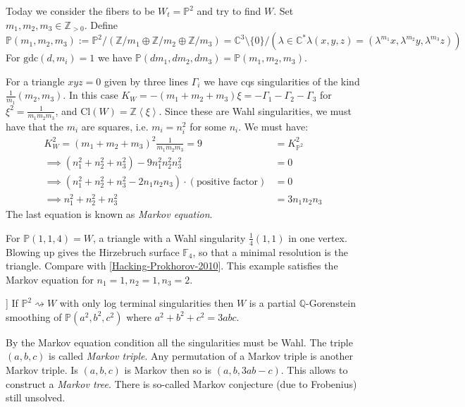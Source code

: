 \medskip\noindent

Today we consider the fibers to be $W_t=\mathbb{P}^2$ and
try to find $W$. Set $m_1,m_2,m_3\in\mathbb{Z}_{>0}$. Define
$$
\mathbb{P}(m_1,m_2,m_3):=
\mathbb{P}^2/(\mathbb{Z}/m_1\oplus\mathbb{Z}/m_2\oplus\mathbb{Z}/m_3)
=\mathbb{C}^3\setminus\{0\}/(\lambda\in\mathbb{C}^*\lambda(x,y,z)
=(\lambda^{m_1}x,\lambda^{m_2}y,\lambda^{m_3}z))
$$
For $\text{gdc}(d,m_i)=1$ we have
$\mathbb{P}(dm_1,dm_2,dm_3)=\mathbb{P}(m_1,m_2,m_3)$.

For a triangle $xyz=0$ given by three lines $\Gamma_i$ we have cqs singularities
of the kind $\frac{1}{m_1}(m_2,m_3)$. In this case
$K_W=-(m_1+m_2+m_3)\xi=-\Gamma_1-\Gamma_2-\Gamma_3$ for
$\xi^2=\frac{1}{m_1m_2m_3}$, and $\text{Cl}(W)=\mathbb{Z}\left<\xi\right>$.
Since these are Wahl singularities, we must have that the $m_i$ are squares,
i.e. $m_i=n_i^2$ for some $n_i$. We must have:
\begin{align*}
K_W^2=(m_1+m_2+m_3)^2\frac{1}{m_1m_2m_3}=9&=K^2_{\mathbb{P}^2}\\
\implies (n_1^2+n_2^2+n_3^2)-9n_1^2n_2^2n_3^2&=0\\
\implies (n_1^2+n_2^2+n_3^2-2n_1n_2n_3)\cdot(\text{positive factor})&=0\\
\implies n_1^2+n_2^2+n_3^2&=3n_1n_2n_3
\end{align*}
The last equation is known as {\it Markov equation}.

\begin{example}
\label{example-Hirzebruch-surface}
For $\mathbb{P}(1,1,4)=W$, a triangle with a Wahl singularity
$\frac{1}{4}(1,1)$ in one vertex. Blowing up gives the Hirzebruch surface
$\mathbb{F}_4$, so that a minimal resolution is the triangle. Compare with
[\href{https://arxiv.org/pdf/2504.19929}{Hacking-Prokhorov-2010}]. This example
satisfies the Markov equation for $n_1=1,n_2=1,n_3=2$.
\end{example}

\begin{theorem}[[HP2010]]
\label{theorem-HP2010}
If $\mathbb{P}^2\rightsquigarrow W$ with only log terminal singularities then
$W$ is a partial $\mathbb{Q}$-Gorenstein smoothing of $\mathbb{P}(a^2,b^2,c^2)$
where $a^2+b^2+c^2=3abc$.
\end{theorem}
By the Markov equation condition all the singularities must be Wahl. The triple
$(a,b,c)$ is called {\it Markov triple}. Any permutation of a Markov triple is
another Markov triple. Is $(a,b,c)$ is Markov then so is $(a,b,3ab-c)$. This
allows to construct a {\it Markov tree}. There is so-called Markov conjecture
(due to Frobenius) still unsolved.

